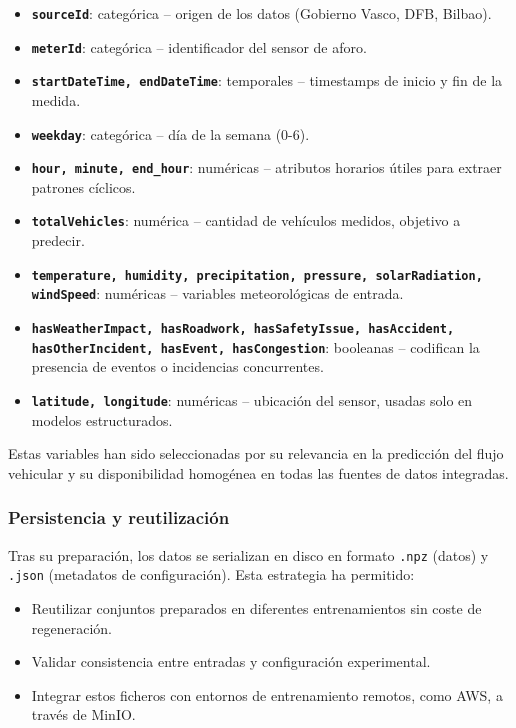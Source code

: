 \begin{itemize}
	\item \textbf{\texttt{sourceId}}: categórica – origen de los datos (Gobierno Vasco, DFB, Bilbao).
	\item \textbf{\texttt{meterId}}: categórica – identificador del sensor de aforo.
	\item \textbf{\texttt{startDateTime, endDateTime}}: temporales – timestamps de inicio y fin de la medida.
	\item \textbf{\texttt{weekday}}: categórica – día de la semana (0-6).
	\item \textbf{\texttt{hour, minute, end\_hour}}: numéricas – atributos horarios útiles para extraer patrones cíclicos.
	\item \textbf{\texttt{totalVehicles}}: numérica – cantidad de vehículos medidos, objetivo a predecir.
	\item \textbf{\texttt{temperature, humidity, precipitation, pressure, solarRadiation, windSpeed}}: numéricas – variables meteorológicas de entrada.
	\item \textbf{\texttt{hasWeatherImpact, hasRoadwork, hasSafetyIssue, hasAccident, hasOtherIncident, hasEvent, hasCongestion}}: booleanas – codifican la presencia de eventos o incidencias concurrentes.
	\item \textbf{\texttt{latitude, longitude}}: numéricas – ubicación del sensor, usadas solo en modelos estructurados.
\end{itemize}

Estas variables han sido seleccionadas por su relevancia en la predicción del flujo vehicular y su disponibilidad homogénea en todas las fuentes de datos integradas.

\subsubsection*{Persistencia y reutilización}

Tras su preparación, los datos se serializan en disco en formato \texttt{.npz} (datos) y \texttt{.json} (metadatos de configuración). Esta estrategia ha permitido:

\begin{itemize}
	\item Reutilizar conjuntos preparados en diferentes entrenamientos sin coste de regeneración.
	\item Validar consistencia entre entradas y configuración experimental.
	\item Integrar estos ficheros con entornos de entrenamiento remotos, como AWS, a través de MinIO.
\end{itemize}


